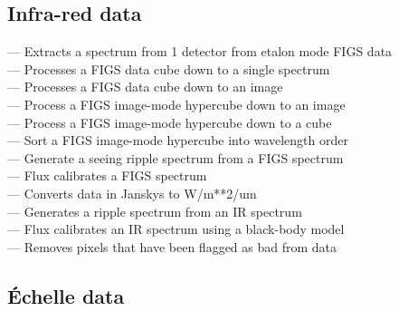 
\subsection{\label{classifinfra}Infra-red data}

 --- Extracts a spectrum from 1 detector from etalon mode FIGS data\\
 --- Processes a FIGS data cube down to a single spectrum\\
 --- Processes a FIGS data cube down to an image\\
 --- Process a FIGS image-mode hypercube down to an image\\
 --- Process a FIGS image-mode hypercube down to a cube\\
 --- Sort a FIGS image-mode hypercube into wavelength order\\
 --- Generate a seeing ripple spectrum from a FIGS spectrum\\
 --- Flux calibrates a FIGS spectrum\\
 --- Converts data in Janskys to W/m**2/um\\
 --- Generates a ripple spectrum from an IR spectrum\\
 --- Flux calibrates an IR spectrum using a black-body model\\
 --- Removes pixels that have been flagged as bad from data


\subsection{\label{classifechelle}\'Echelle data}

